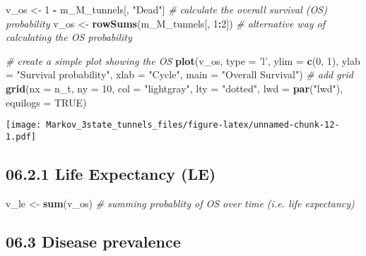\documentclass[
]{article}
\newenvironment{Shaded}{\begin{snugshade}}{\end{snugshade}}
\newcommand{\CommentTok}[1]{\textcolor[rgb]{0.56,0.35,0.01}{\textit{#1}}}
\newcommand{\DataTypeTok}[1]{\textcolor[rgb]{0.13,0.29,0.53}{#1}}
\newcommand{\DecValTok}[1]{\textcolor[rgb]{0.00,0.00,0.81}{#1}}
\newcommand{\KeywordTok}[1]{\textcolor[rgb]{0.13,0.29,0.53}{\textbf{#1}}}
\newcommand{\NormalTok}[1]{#1}
\newcommand{\OperatorTok}[1]{\textcolor[rgb]{0.81,0.36,0.00}{\textbf{#1}}}
\newcommand{\OtherTok}[1]{\textcolor[rgb]{0.56,0.35,0.01}{#1}}
\newcommand{\StringTok}[1]{\textcolor[rgb]{0.31,0.60,0.02}{#1}}
\begin{document}
\begin{Shaded}
\begin{Highlighting}[]
\NormalTok{v_os <-}\StringTok{ }\DecValTok{1} \OperatorTok{-}\StringTok{ }\NormalTok{m_M_tunnels[, }\StringTok{"Dead"}\NormalTok{]    }\CommentTok{# calculate the overall survival (OS) probability}
\NormalTok{v_os <-}\StringTok{ }\KeywordTok{rowSums}\NormalTok{(m_M_tunnels[, }\DecValTok{1}\OperatorTok{:}\DecValTok{2}\NormalTok{])  }\CommentTok{# alternative way of calculating the OS probability   }

\CommentTok{# create a simple plot showing the OS}
\KeywordTok{plot}\NormalTok{(v_os, }\DataTypeTok{type =} \StringTok{'l'}\NormalTok{, }
     \DataTypeTok{ylim =} \KeywordTok{c}\NormalTok{(}\DecValTok{0}\NormalTok{, }\DecValTok{1}\NormalTok{),}
     \DataTypeTok{ylab =} \StringTok{"Survival probability"}\NormalTok{,}
     \DataTypeTok{xlab =} \StringTok{"Cycle"}\NormalTok{,}
     \DataTypeTok{main =} \StringTok{"Overall Survival"}\NormalTok{)             }
\CommentTok{# add grid }
\KeywordTok{grid}\NormalTok{(}\DataTypeTok{nx =}\NormalTok{ n_t, }\DataTypeTok{ny =} \DecValTok{10}\NormalTok{, }\DataTypeTok{col =} \StringTok{"lightgray"}\NormalTok{, }\DataTypeTok{lty =} \StringTok{"dotted"}\NormalTok{, }\DataTypeTok{lwd =} \KeywordTok{par}\NormalTok{(}\StringTok{"lwd"}\NormalTok{), }\DataTypeTok{equilogs =} \OtherTok{TRUE}\NormalTok{) }
\end{Highlighting}
\end{Shaded}

\texttt{[image: Markov\_3state\_tunnels\_files/figure-latex/unnamed-chunk-12-1.pdf]}

\hypertarget{life-expectancy-le}{%
\subsection{06.2.1 Life Expectancy (LE)}\label{life-expectancy-le}}

\begin{Shaded}
\begin{Highlighting}[]
\NormalTok{v_le <-}\StringTok{ }\KeywordTok{sum}\NormalTok{(v_os)           }\CommentTok{# summing probablity of OS over time  (i.e. life expectancy)}
\end{Highlighting}
\end{Shaded}

\hypertarget{disease-prevalence}{%
\subsection{06.3 Disease prevalence}\label{disease-prevalence}}
\end{document}
